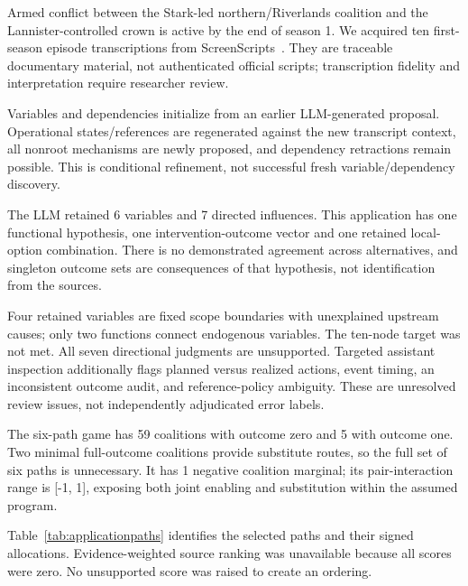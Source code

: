 Armed conflict between the Stark-led northern/Riverlands coalition and the Lannister-controlled crown is active by the end of season 1. We acquired ten first-season episode transcriptions from ScreenScripts~\cite{screenscripts}. They are traceable documentary material, not authenticated official scripts; transcription fidelity and interpretation require researcher review.

Variables and dependencies initialize from an earlier LLM-generated proposal. Operational states/references are regenerated against the new transcript context, all nonroot mechanisms are newly proposed, and dependency retractions remain possible. This is conditional refinement, not successful fresh variable/dependency discovery.

The LLM retained 6 variables and 7 directed influences. This application has one functional hypothesis, one intervention-outcome vector and one retained local-option combination. There is no demonstrated agreement across alternatives, and singleton outcome sets are consequences of that hypothesis, not identification from the sources.

Four retained variables are fixed scope boundaries with unexplained upstream causes; only two functions connect endogenous variables. The ten-node target was not met. All seven directional judgments are unsupported. Targeted assistant inspection additionally flags planned versus realized actions, event timing, an inconsistent outcome audit, and reference-policy ambiguity. These are unresolved review issues, not independently adjudicated error labels.

The six-path game has 59 coalitions with outcome zero and 5 with outcome one. Two minimal full-outcome coalitions provide substitute routes, so the full set of six paths is unnecessary. It has 1 negative coalition marginal; its pair-interaction range is [-1, 1], exposing both joint enabling and substitution within the assumed program.

Table~\ref{tab:applicationpaths} identifies the selected paths and their signed allocations. Evidence-weighted source ranking was unavailable because all scores were zero. No unsupported score was raised to create an ordering.

